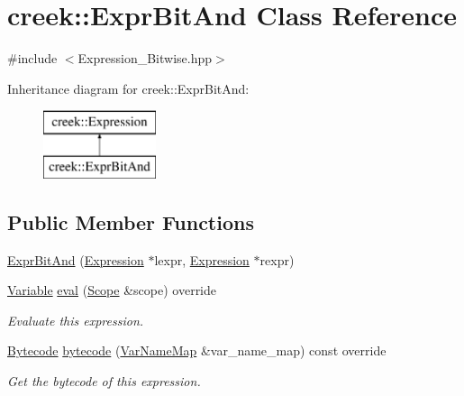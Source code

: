\hypertarget{classcreek_1_1_expr_bit_and}{}\section{creek\+:\+:Expr\+Bit\+And Class Reference}
\label{classcreek_1_1_expr_bit_and}


{\ttfamily \#include $<$Expression\+\_\+\+Bitwise.\+hpp$>$}

Inheritance diagram for creek\+:\+:Expr\+Bit\+And\+:\begin{figure}[H]
\begin{center}
\leavevmode
\includegraphics[height=2.000000cm]{classcreek_1_1_expr_bit_and}
\end{center}
\end{figure}
\subsection*{Public Member Functions}
\begin{DoxyCompactItemize}
\item 
\hyperlink{classcreek_1_1_expr_bit_and_ab3304289071a9ffd03d4b8dd9d2cae8f}{Expr\+Bit\+And} (\hyperlink{classcreek_1_1_expression}{Expression} $\ast$lexpr, \hyperlink{classcreek_1_1_expression}{Expression} $\ast$rexpr)
\item 
\hyperlink{classcreek_1_1_variable}{Variable} \hyperlink{classcreek_1_1_expr_bit_and_a59a8927267c2e7e2af9cc2b6ea757b93}{eval} (\hyperlink{classcreek_1_1_scope}{Scope} \&scope) override
\begin{DoxyCompactList}\small\item\em Evaluate this expression. \end{DoxyCompactList}\item 
\hyperlink{classcreek_1_1_bytecode}{Bytecode} \hyperlink{classcreek_1_1_expr_bit_and_a5b0773eef67335c58c362b8199a0c756}{bytecode} (\hyperlink{classcreek_1_1_var_name_map}{Var\+Name\+Map} \&var\+\_\+name\+\_\+map) const  override\hypertarget{classcreek_1_1_expr_bit_and_a5b0773eef67335c58c362b8199a0c756}{}\label{classcreek_1_1_expr_bit_and_a5b0773eef67335c58c362b8199a0c756}

\begin{DoxyCompactList}\small\item\em Get the bytecode of this expression. \end{DoxyCompactList}\end{DoxyCompactItemize}



